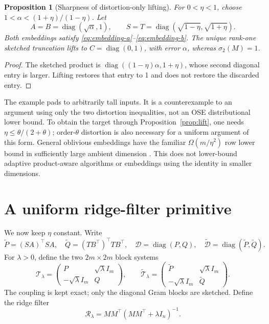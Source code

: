\documentclass[11pt]{article}
\newtheorem{proposition}[theorem]{Proposition}
\theoremstyle{remark}
\newcommand{\diag}{\operatorname{diag}}
\begin{document}
\begin{proposition}[Sharpness of distortion-only lifting]\label{prop:reversal}
For \(0<\eta<1\), choose
\(1<\alpha<(1+\eta)/(1-\eta)\). Let
\[
 A=B=\diag(\sqrt\alpha,1),\qquad
 S=T=\diag(\sqrt{1-\eta},\sqrt{1+\eta}).
\]
Both embeddings satisfy \eqref{eq:embedding-a}--\eqref{eq:embedding-b}.
The unique rank-one sketched truncation lifts to
\(C=\diag(0,1)\), with error \(\alpha\), whereas \(\sigma_2(M)=1\).
\end{proposition}
\begin{proof}
The sketched product is
\(\diag((1-\eta)\alpha,1+\eta)\), whose second diagonal entry is larger.
Lifting restores that entry to 1 and does not restore the discarded entry.
\end{proof}

The example pads to arbitrarily tall inputs. It is a counterexample to an
argument using only the two distortion inequalities, not an OSE distributional
lower bound. To obtain the target through Proposition~\ref{prop:lift}, one
needs \(\eta\leq\theta/(2+\theta)\); order-\(\theta\) distortion is also
necessary for a uniform argument of this form. General oblivious embeddings
have the familiar \(\Omega(m/\eta^2)\) row lower bound in sufficiently large
ambient dimension \cite{oselower}. This does not lower-bound adaptive
product-aware algorithms or embeddings using the identity in smaller dimensions.

\section{A uniform ridge-filter primitive}
We now keep \(\eta\) constant. Write
\[
 \widetilde P=(SA)^\top SA,\quad
 \widetilde Q=(TB^\top)^\top TB^\top,\quad
 \mathcal D=\diag(P,Q),\quad
 \widetilde{\mathcal D}=\diag(\widetilde P,\widetilde Q).
\]
For \(\lambda>0\), define the two \(2m\times2m\) block systems
\begin{equation}\label{eq:block}
 \mathcal T_\lambda=
 \begin{pmatrix}P&\sqrt\lambda I_m\\-\sqrt\lambda I_m&Q\end{pmatrix},
 \qquad
 \widetilde{\mathcal T}_\lambda=
 \begin{pmatrix}\widetilde P&\sqrt\lambda I_m\\-\sqrt\lambda I_m&\widetilde Q\end{pmatrix}.
\end{equation}
The coupling is kept exact; only the diagonal Gram blocks are sketched.
Define the ridge filter
\[
 \mathcal R_\lambda=MM^\top(MM^\top+\lambda I_n)^{-1}.
\]
\end{document}

